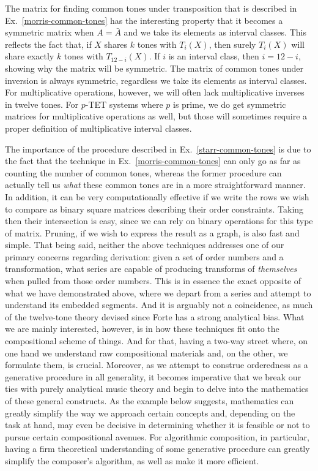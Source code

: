 The matrix for finding common tones under transposition that is described in Ex.~\ref{morris-common-tones} has the interesting property that it becomes a symmetric matrix when $A = \bar{A}$ and we take its elements as interval classes. This reflects the fact that, if $X$ shares $k$ tones with $T_i(X)$, then surely $T_i(X)$ will share exactly $k$ tones with $T_{12 - i}(X)$. If $i$ is an interval class, then $i = 12 - i$, showing why the matrix will be symmetric. The matrix of common tones under inversion is always symmetric, regardless we take its elements as interval classes. For multiplicative operations, however, we will often lack multiplicative inverses in twelve tones. For $p$-TET systems where $p$ is prime, we do get symmetric matrices for multiplicative operations as well, but those will sometimes require a proper definition of multiplicative interval classes.

The importance of the procedure described in Ex.~\ref{starr-common-tones} is due to the fact that the technique in Ex.~\ref{morris-common-tones} can only go as far as counting the number of common tones, whereas the former procedure can actually tell us \emph{what} these common tones are in a more straightforward manner. In addition, it can be very computationally effective if we write the rows we wish to compare as binary square matrices describing their order constraints. Taking then their intersection is easy, since we can rely on binary operations for this type of matrix. Pruning, if we wish to express the result as a graph, is also fast and simple. That being said, neither the above techniques addresses one of our primary concerns regarding derivation: given a set of order numbers and a transformation, what series are capable of producing transforms of \emph{themselves} when pulled from those order numbers. This is in essence the exact opposite of what we have demonstrated above, where we depart from a series and attempt to understand its embedded segments. And it is arguably not a coincidence, as much of the twelve-tone theory devised since Forte has a strong analytical bias. What we are mainly interested, however, is in how these techniques fit onto the compositional scheme of things. And for that, having a two-way street where, on one hand we understand raw compositional materials and, on the other, we formulate them, is crucial. Moreover, as we attempt to construe orderedness as a generative procedure in all generality, it becomes imperative that we break our ties with purely analytical music theory and begin to delve into the mathematics of these general constructs. As the example below suggests, mathematics can greatly simplify the way we approach certain concepts and, depending on the task at hand, may even be decisive in determining whether it is feasible or not to pursue certain compositional avenues. For algorithmic composition, in particular, having a firm theoretical understanding of some generative procedure can greatly simplify the composer's algorithm, as well as make it more efficient.

